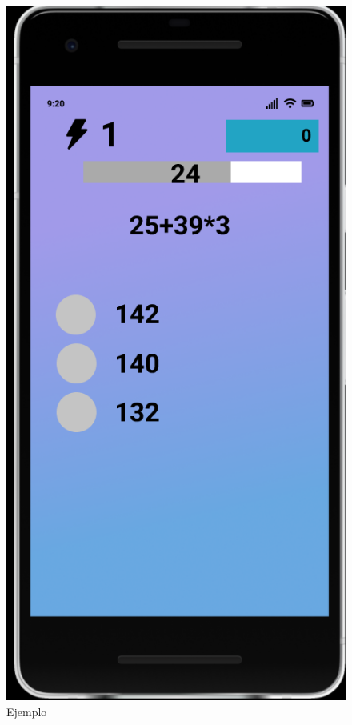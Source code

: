\documentclass{article}
\begin{document}
\begin{figure}[H]
    \centering
    \includegraphics[scale=0.8]{imgs/Figma/Ejemplo}
    \caption{Ejemplo}
\end{figure}
\end{document}
